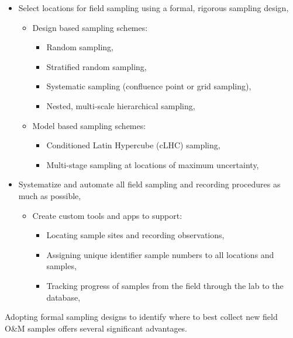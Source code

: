 \documentclass[graybox,natbib,nospthms,UStrade]{svmono}
\begin{document}
\begin{itemize}
\item
  Select locations for field sampling using a formal, rigorous
  sampling design,

  \begin{itemize}
  \item
    Design based sampling schemes:

    \begin{itemize}
    \item
      Random sampling,
    \item
      Stratified random sampling,
    \item
      Systematic sampling (confluence point or grid sampling),
    \item
      Nested, multi-scale hierarchical sampling,
    \end{itemize}
  \item
    Model based sampling schemes:

    \begin{itemize}
    \item
      Conditioned Latin Hypercube (cLHC) sampling,
    \item
      Multi-stage sampling at locations of maximum uncertainty,
    \end{itemize}
  \end{itemize}
\item
  Systematize and automate all field sampling and recording procedures
  as much as possible,

  \begin{itemize}
  \item
    Create custom tools and apps to support:

    \begin{itemize}
    \item
      Locating sample sites and recording observations,
    \item
      Assigning unique identifier sample numbers to all locations
      and samples,
    \item
      Tracking progress of samples from the field through the lab
      to the database,
    \end{itemize}
  \end{itemize}
\end{itemize}

Adopting formal sampling designs to identify where to best collect new
field O\&M samples offers several significant advantages.
\end{document}
